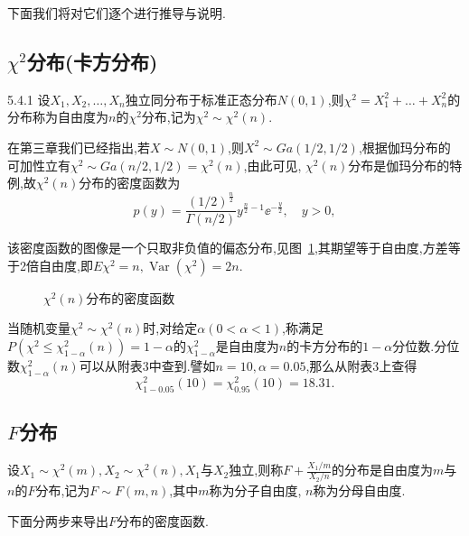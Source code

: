 下面我们将对它们逐个进行推导与说明.
\subsection{$\chi^2$分布(卡方分布)\label{ssec:5.4.1}}
\begin{definition}{}{5.4.1}
设$X_1,X_2,\dotsc,X_n$独立同分布于标准正态分布$N(0,1)$,则$\chi^2=X_1^2+\dotsc+X_n^2$的分布称为自由度为$n$的$\chi^2$分布,记为$\chi^2\sim\chi^2(n)$.
\end{definition}

在第三章我们已经指出,若$X\sim N(0,1)$,则$X^2\sim Ga(1/2,1/2)$,根据伽玛分布的可加性立有$\chi^2\sim Ga(n/2,1/2)=\chi^2(n)$,由此可见, $\chi^2(n)$分布是伽玛分布的特例,故$\chi^2(n)$分布的密度函数为
\[p(y)=\frac{(1/2)^{\frac n2}}{\Gamma(n/2)}y^{\frac n2-1}\ee^{-\frac y2},\quad y>0,\]

该密度函数的图像是一个只取非负值的偏态分布,见图~\ref{fig:5.4.1},其期望等于自由度,方差等于2倍自由度,即$E\chi^2=n,\operatorname{Var}(\chi^2)=2n$.
\begin{figure}[!ht]
  \centering
{}
  \caption{$\chi^2(n)$分布的密度函数}\label{fig:5.4.1}
\end{figure}


当随机变量$\chi^2\sim\chi^2(n)$时,对给定$\alpha(0<\alpha<1)$,称满足$P(\chi^2\leq\chi_{1-\alpha}^2(n))=1-\alpha$的$\chi_{1-\alpha}^2$是自由度为$n$的卡方分布的$1-\alpha$分位数.分位数$\chi_{1-\alpha}^2(n)$可以从附表3中查到.譬如$n=10,\alpha=0.05$,那么从附表3上查得
\[\chi_{1-0.05}^2(10)=\chi_{0.95}^2(10)=18.31.\]
\subsection{$F$分布\label{ssec:5.4.2}}
\begin{definition}{}{}
设$X_1\sim\chi^2(m),X_2\sim\chi^2(n),X_1$与$X_2$独立,则称$F+\frac{X_1/m}{X_2/n}$的分布是自由度为$m$与$n$的$F$分布,记为$F\sim F(m,n)$,其中$m$称为分子自由度, $n$称为分母自由度.
\end{definition}
下面分两步来导出$F$分布的密度函数.


